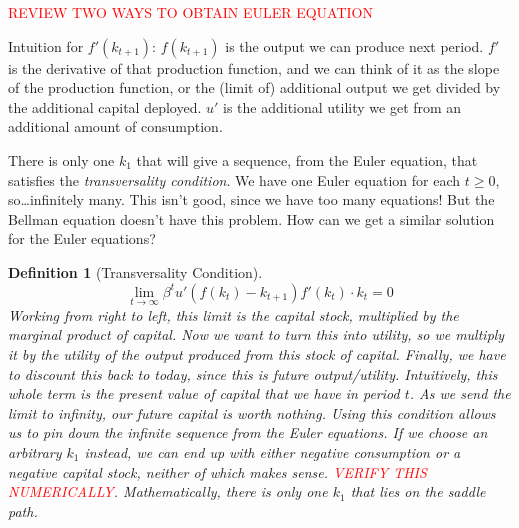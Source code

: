 \documentclass[11pt]{article}
\newtheorem*{definition}{Definition}
\newcommand{\rd}{\textcolor{red}}
\begin{document}
\rd{REVIEW TWO WAYS TO OBTAIN EULER EQUATION}

Intuition for \(f'(k_{t + 1})\): \(f(k_{t + 1})\) is the output we can produce next period. \(f'\) is the derivative of that production function, and we can think of it as the slope of the production function, or the (limit of) additional output we get divided by the additional capital deployed. \(u'\) is the additional utility we get from an additional amount of consumption.

There is only one \(k_1\) that will give a sequence, from the Euler equation, that satisfies the \emph{transversality condition}. We have one Euler equation for each \(t \ge 0\), so\ldots infinitely many. This isn't good, since we have too many equations! But the Bellman equation doesn't have this problem. How can we get a similar solution for the Euler equations?

\begin{definition}[Transversality Condition]
\[
\lim_{t \to \infty} \beta^t u'(f(k_t) - k_{t + 1}) f'(k_t) \cdot k_t = 0
\]
Working from right to left, this limit is the capital stock, multiplied by the marginal product of capital. Now we want to turn this into utility, so we multiply it by the utility of the output produced from this stock of capital. Finally, we have to discount this back to today, since this is future output/utility. Intuitively, this whole term is the present value of capital that we have in period $t$. As we send the limit to infinity, our future capital is worth nothing. Using this condition allows us to pin down the infinite sequence from the Euler equations. If we choose an arbitrary $k_1$ instead, we can end up with either negative consumption or a negative capital stock, neither of which makes sense. \rd{VERIFY THIS NUMERICALLY}. Mathematically, there is only one $k_1$ that lies on the saddle path.
\end{definition}
\end{document}
